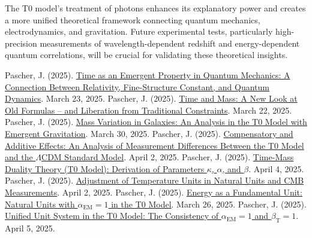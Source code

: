 \documentclass[12pt,a4paper]{article}
\newcommand{\betaT}{\beta_{\text{T}}}
\newcommand{\alphaEM}{\alpha_{\text{EM}}}
\begin{document}
	The T0 model's treatment of photons enhances its explanatory power and creates a more unified theoretical framework connecting quantum mechanics, electrodynamics, and gravitation. Future experimental tests, particularly high-precision measurements of wavelength-dependent redshift and energy-dependent quantum correlations, will be crucial for validating these theoretical insights.
	
	\begin{thebibliography}{99}
		 Pascher, J. (2025). \href{https://github.com/jpascher/T0-Time-Mass-Duality/tree/main/2/pdf/English/ZeitEmergentQMEn.pdf}{Time as an Emergent Property in Quantum Mechanics: A Connection Between Relativity, Fine-Structure Constant, and Quantum Dynamics}. March 23, 2025.
		 Pascher, J. (2025). \href{https://github.com/jpascher/T0-Time-Mass-Duality/tree/main/2/pdf/English/ZeitMasseNeuerBlickEn.pdf}{Time and Mass: A New Look at Old Formulas – and Liberation from Traditional Constraints}. March 22, 2025.
		 Pascher, J. (2025). \href{https://github.com/jpascher/T0-Time-Mass-Duality/tree/main/2/pdf/English/MassVarGalaxienEn.pdf}{Mass Variation in Galaxies: An Analysis in the T0 Model with Emergent Gravitation}. March 30, 2025.
		 Pascher, J. (2025). \href{https://github.com/jpascher/T0-Time-Mass-Duality/tree/main/2/pdf/English/MessdifferenzenT0StandardEn.pdf}{Compensatory and Additive Effects: An Analysis of Measurement Differences Between the T0 Model and the \(\Lambda\)CDM Standard Model}. April 2, 2025.
		 Pascher, J. (2025). \href{https://github.com/jpascher/T0-Time-Mass-Duality/tree/main/2/pdf/English/ZeitMasseT0ParamsEn.pdf}{Time-Mass Duality Theory (T0 Model): Derivation of Parameters \(\kappa\), \(\alpha\), and \(\beta\)}. April 4, 2025.
		 Pascher, J. (2025). \href{https://github.com/jpascher/T0-Time-Mass-Duality/tree/main/2/pdf/English/TempEinheitenCMBEn.pdf}{Adjustment of Temperature Units in Natural Units and CMB Measurements}. April 2, 2025.
		 Pascher, J. (2025). \href{https://github.com/jpascher/T0-Time-Mass-Duality/tree/main/2/pdf/English/NatEinheitenAlpha1En.pdf}{Energy as a Fundamental Unit: Natural Units with \(\alphaEM = 1\) in the T0 Model}. March 26, 2025.
		 Pascher, J. (2025). \href{https://github.com/jpascher/T0-Time-Mass-Duality/tree/main/2/pdf/English/Alpha1Beta1KonsistenzEn.pdf}{Unified Unit System in the T0 Model: The Consistency of \(\alphaEM = 1\) and \(\betaT = 1\)}. April 5, 2025.

\end{thebibliography}
\end{document}
